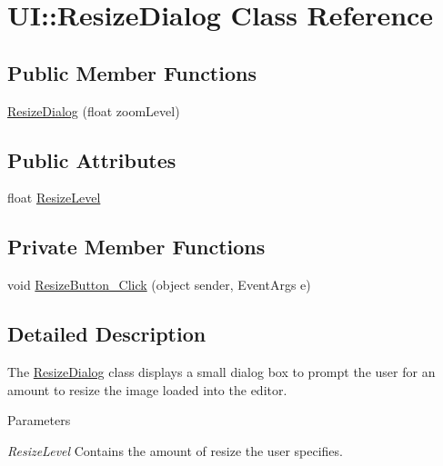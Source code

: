 \hypertarget{class_u_i_1_1_resize_dialog}{
\section{UI::ResizeDialog Class Reference}
\label{class_u_i_1_1_resize_dialog}
}
\subsection*{Public Member Functions}
\begin{DoxyCompactItemize}
\item 
\hyperlink{class_u_i_1_1_resize_dialog_ada896a290881c73569c3ce7570bf45c7}{ResizeDialog} (float zoomLevel)
\end{DoxyCompactItemize}
\subsection*{Public Attributes}
\begin{DoxyCompactItemize}
\item 
float \hyperlink{class_u_i_1_1_resize_dialog_af8b6b6d17d8ca70b6721793ca833f7e9}{ResizeLevel}
\end{DoxyCompactItemize}
\subsection*{Private Member Functions}
\begin{DoxyCompactItemize}
\item 
void \hyperlink{class_u_i_1_1_resize_dialog_a8bd7462ff2288c8e77d91e3197729ccc}{ResizeButton\_\-Click} (object sender, EventArgs e)
\end{DoxyCompactItemize}


\subsection{Detailed Description}
The \hyperlink{class_u_i_1_1_resize_dialog}{ResizeDialog} class displays a small dialog box to prompt the user for an amount to resize the image loaded into the editor.


\begin{DoxyParams}{Parameters}
\item[{\em ResizeLevel}]Contains the amount of resize the user specifies. \end{DoxyParams}


